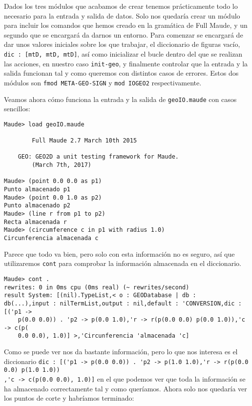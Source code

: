 Dados los tres módulos que acabamos de crear tenemos prácticamente todo lo necesario para la entrada y salida de datos. Solo nos quedaría crear un módulo para incluir los comandos que hemos creado en la gramática de Full Maude, y un segundo que se encargará da darnos un entorno. Para comenzar se encargará de dar unos valores iniciales sobre los que trabajar, el diccionario de figuras vacío, \verb"dic : [mtD, mtD, mtD]", así como inicializar el bucle dentro del que se realizan las acciones, en nuestro caso \verb"init-geo", y finalmente controlar que la entrada y la salida funcionan tal y como queremos con distintos casos de errores. Estos dos módulos son \verb"fmod META-GEO-SIGN" y \verb"mod IOGEO2" respectivamente.\par

Veamos ahora cómo funciona la entrada y la salida de \texttt{geoIO.maude} con casos sencillos:\par 

{\codesize
\begin{verbatim}
Maude> load geoIO.maude

	    Full Maude 2.7 March 10th 2015

	GEO: GEO2D a unit testing framework for Maude.
		(March 7th, 2017)

Maude> (point 0.0 0.0 as p1)
Punto almacenado p1
Maude> (point 0.0 1.0 as p2)
Punto almacenado p2
Maude> (line r from p1 to p2)
Recta almacenada r
Maude> (circumference c in p1 with radius 1.0)
Circunferencia almacenada c
\end{verbatim}
}

Parece que todo va bien, pero solo con esta información no es seguro, así que utilizaremos \verb"cont" para comprobar la información almacenada en el diccionario.\par

{\codesize
\begin{verbatim}
Maude> cont .
rewrites: 0 in 0ms cpu (0ms real) (~ rewrites/second)
result System: [(nil).TypeList,< o : GEODatabase | db : 
db(...),input : nilTermList,output : nil,default : 'CONVERSION,dic : [('p1 ->
    p(0.0 0.0)) . 'p2 -> p(0.0 1.0),'r -> r(p(0.0 0.0) p(0.0 1.0)),'c -> c(p(
    0.0 0.0), 1.0)] >,'Circunferencia 'almacenada 'c]
\end{verbatim}
}

Como se puede ver nos da bastante información, pero lo que nos interesa es el diccionario \verb"dic : [('p1 -> p(0.0 0.0)) . 'p2 -> p(1.0 1.0),'r -> r(p(0.0 0.0) p(1.0 1.0))"\\ \verb",'c -> c(p(0.0 0.0), 1.0)]" en el que podemos ver que toda la información se ha almacenado correctamente tal y como queríamos. Ahora solo nos quedaría ver los puntos de corte y habríamos terminado:\par

